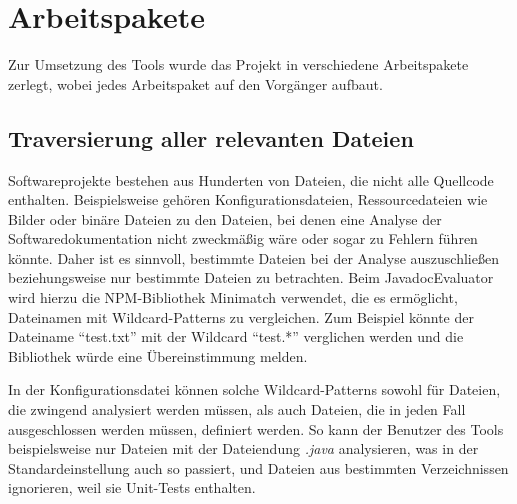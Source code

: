 \section{Arbeitspakete}
Zur Umsetzung des Tools wurde das Projekt in verschiedene Arbeitspakete zerlegt, wobei jedes Arbeitspaket auf den Vorgänger aufbaut.
\subsection{Traversierung aller relevanten Dateien} 
Softwareprojekte bestehen aus Hunderten von Dateien, die nicht alle Quellcode enthalten. Beispielsweise gehören Konfigurationsdateien, Ressourcedateien wie Bilder oder binäre Dateien zu den Dateien, bei denen eine Analyse der Softwaredokumentation nicht zweckmäßig wäre oder sogar zu Fehlern führen könnte. Daher ist es sinnvoll, bestimmte Dateien bei der Analyse auszuschließen beziehungsweise nur bestimmte Dateien zu betrachten. Beim JavadocEvaluator wird hierzu die NPM-Bibliothek Minimatch \cite{Minimatch} verwendet, die es ermöglicht, Dateinamen mit Wildcard-Patterns zu vergleichen. Zum Beispiel könnte der Dateiname \enquote{test.txt} mit der Wildcard \enquote{test.*} verglichen werden und die Bibliothek würde eine Übereinstimmung melden.

  

In der Konfigurationsdatei können solche Wildcard-Patterns sowohl für Dateien, die zwingend analysiert werden müssen, als auch Dateien, die in jeden Fall ausgeschlossen werden müssen, definiert werden. So kann der Benutzer des Tools beispielsweise nur Dateien mit der Dateiendung \textit{.java} analysieren, was in der Standardeinstellung auch so passiert, und Dateien aus bestimmten Verzeichnissen ignorieren, weil sie Unit-Tests enthalten.   

  

